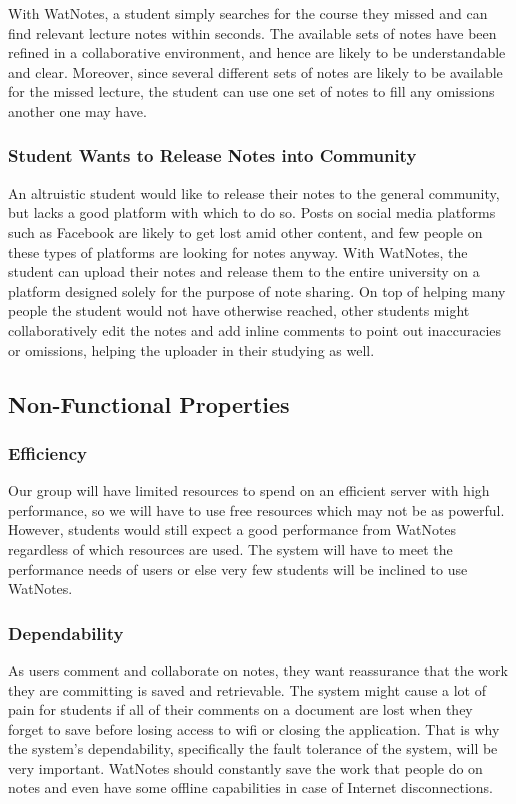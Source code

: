 \documentclass[12pt]{article}
\begin{document}
  With WatNotes, a student simply searches for the course they missed and can find relevant lecture notes within seconds. The available sets of notes have been refined in a collaborative environment, and hence are likely to be understandable and clear. Moreover, since several different sets of notes are likely to be available for the missed lecture, the student can use one set of notes to fill any omissions another one may have.
  \subsubsection{Student Wants to Release Notes into Community}
  An altruistic student would like to release their notes to the general community, but lacks a good platform with which to do so. Posts on social media platforms such as Facebook are likely to get lost amid other content, and few people on these types of platforms are looking for notes anyway. With WatNotes, the student can upload their notes and release them to the entire university on a platform designed solely for the purpose of note sharing. On top of helping many people the student would not have otherwise reached, other students might collaboratively edit the notes and add inline comments to point out inaccuracies or omissions, helping the uploader in their studying as well.
\subsection{Non-Functional Properties}
  \subsubsection{Efficiency}
  Our group will have limited resources to spend on an efficient server with high performance, so we will have to use free resources which may not be as powerful. However, students would still expect a good performance from WatNotes regardless of which resources are used. The system will have to meet the performance needs of users or else very few students will be inclined to use WatNotes.

  \subsubsection{Dependability}
  As users comment and collaborate on notes, they want reassurance that the work they are committing is saved and retrievable. The system might cause a lot of pain for students if all of their comments on a document are lost when they forget to save before losing access to wifi or closing the application. That is why the system's dependability, specifically the fault tolerance of the system, will be very important. WatNotes should constantly save the work that people do on notes and even have some offline capabilities in case of Internet disconnections. 
\end{document}
